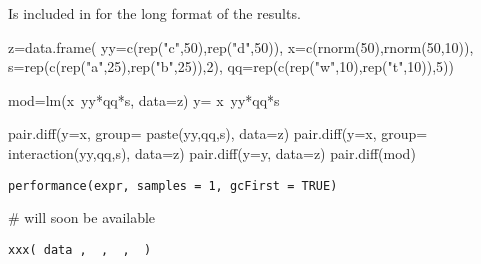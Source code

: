 \documentclass[a4paper]{book}
\begin{document}
%
\begin{SeeAlso}\relax
Is included in  for the long format of the results.
\end{SeeAlso}
%
\begin{Examples}
\begin{ExampleCode}

z=data.frame( yy=c(rep("c",50),rep("d",50)),
              x=c(rnorm(50),rnorm(50,10)),
              s=rep(c(rep("a",25),rep("b",25)),2),
              qq=rep(c(rep("w",10),rep("t",10)),5))

mod=lm(x~yy*qq*s, data=z)
y= x~yy*qq*s

pair.diff(y=x, group= paste(yy,qq,s), data=z)
pair.diff(y=x, group= interaction(yy,qq,s), data=z)
pair.diff(y=y, data=z)
pair.diff(mod)
\end{ExampleCode}
\end{Examples}
\newpage
{}
%
\begin{Usage}
\begin{verbatim}
performance(expr, samples = 1, gcFirst = TRUE)
\end{verbatim}
\end{Usage}
%
\begin{Arguments}
\begin{ldescription}
\item[\code{expr}] 


\item[\code{samples}] 


\item[\code{gcFirst}] 


\end{ldescription}
\end{Arguments}
%
\begin{Examples}
\begin{ExampleCode}
# will soon be available
\end{ExampleCode}
\end{Examples}
\newpage
{}
%
\begin{Usage}
\begin{verbatim}
xxx( data ,  ,  ,  )
\end{verbatim}
\end{Usage}
%
\begin{Arguments}
\begin{ldescription}
\item[\code{data}] 


\end{ldescription}
\end{Arguments}
\end{document}
